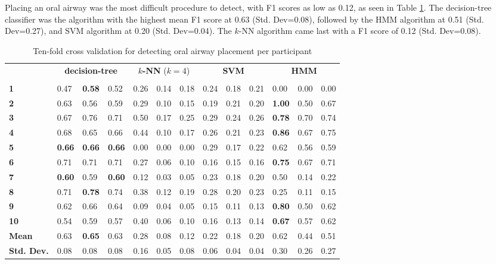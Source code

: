 \par Placing an oral airway was the most difficult procedure to detect, with F1 scores as low as 0.12, as seen in Table \ref{tab:o:ml}. The decision-tree classifier was the algorithm with the highest mean F1 score at 0.63 (Std. Dev=0.08), followed by the HMM algorithm at 0.51 (Std. Dev=0.27), and SVM algorithm at 0.20 (Std. Dev=0.04). The $k$-NN algorithm came last with a F1 score of 0.12 (Std. Dev=0.08).
\begin{table}[h]
	\centering
	\begin{tabular}{lllllllllllll}
		\multirow{2}{*}{\rotatebox[origin=c]{45}{\textbf{Participant}}} & \multicolumn{3}{c}{\textbf{decision-tree}} & \multicolumn{3}{c}{\textbf{$k$-NN} ($k=4$)} & \multicolumn{3}{c}{\textbf{SVM}} & \multicolumn{3}{c}{\textbf{HMM}} \\
		& \rot{Precision}     & \rot{Recall}    & \rot{F1}    & \rot{Precision}     & \rot{Recall}    & \rot{F1}  & \rot{Precision}     & \rot{Recall}    & \rot{F1} & \rot{Precision}     & \rot{Recall}    & \rot{F1} \\
		\textbf{1}   & 0.47 & \textbf{0.58} & 0.52 & 0.26 & 0.14 & 0.18 & 0.24 & 0.18 & 0.21 & 0.00 & 0.00 & 0.00 \\
		\textbf{2}   & 0.63 & 0.56 & 0.59 & 0.29 & 0.10 & 0.15 & 0.19 & 0.21 & 0.20 & \textbf{1.00} & 0.50 & 0.67 \\
		\textbf{3}   & 0.67 & 0.76 & 0.71 & 0.50 & 0.17 & 0.25 & 0.29 & 0.24 & 0.26 & \textbf{0.78} & 0.70 & 0.74 \\
		\textbf{4}   & 0.68 & 0.65 & 0.66 & 0.44 & 0.10 & 0.17 & 0.26 & 0.21 & 0.23 & \textbf{0.86} & 0.67 & 0.75 \\
		\textbf{5}   & \textbf{0.66} & \textbf{0.66} & \textbf{0.66} & 0.00 & 0.00 & 0.00 & 0.29 & 0.17 & 0.22 & 0.62 & 0.56 & 0.59 \\
		\textbf{6}   & 0.71 & 0.71 & 0.71 & 0.27 & 0.06 & 0.10 & 0.16 & 0.15 & 0.16 & \textbf{0.75} & 0.67 & 0.71 \\
		\textbf{7}   & \textbf{0.60} & 0.59 & \textbf{0.60} & 0.12 & 0.03 & 0.05 & 0.23 & 0.18 & 0.20 & 0.50 & 0.14 & 0.22 \\
		\textbf{8}   & 0.71 & \textbf{0.78} & 0.74 & 0.38 & 0.12 & 0.19 & 0.28 & 0.20 & 0.23 & 0.25 & 0.11 & 0.15 \\
		\textbf{9}   & 0.62 & 0.66 & 0.64 & 0.09 & 0.04 & 0.05 & 0.15 & 0.11 & 0.13 & \textbf{0.80} & 0.50 & 0.62 \\
		\textbf{10} & 0.54 & 0.59 & 0.57 & 0.40 & 0.06 & 0.10 & 0.16 & 0.13 & 0.14 & \textbf{0.67} & 0.57 & 0.62 \\
		\hline
		\textbf{Mean} & 0.63 & \textbf{0.65} & 0.63 & 0.28 & 0.08 & 0.12 & 0.22 & 0.18 & 0.20 & 0.62 & 0.44 & 0.51 \\
		\textbf{Std. Dev.} & 0.08 & 0.08 & 0.08 & 0.16 & 0.05 & 0.08 & 0.06 & 0.04 & 0.04 & 0.30 & 0.26 & 0.27 \\
	\end{tabular}
	\caption{Ten-fold cross validation for detecting oral airway placement per participant}
	\label{tab:o:ml}
\end{table}


